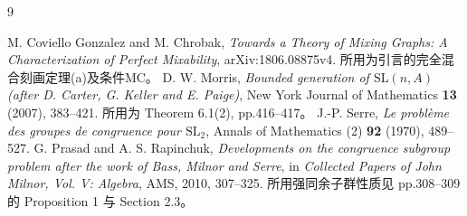 \documentclass[11pt,a4paper,oneside,openany]{book}
\theoremstyle{definition}
\numberwithin{equation}{chapter}
\begin{document}
\backmatter
\begin{thebibliography}{9}
 M. Coviello Gonzalez and M. Chrobak,
\emph{Towards a Theory of Mixing Graphs: A Characterization of Perfect Mixability},
arXiv:1806.08875v4. 所用为引言的完全混合刻画定理(a)及条件MC。
 D. W. Morris,
\emph{Bounded generation of $\mathrm{SL}(n,A)$ (after D. Carter, G. Keller and E. Paige)},
New York Journal of Mathematics \textbf{13} (2007), 383--421.
所用为 Theorem 6.1(2), pp.416--417。
 J.-P. Serre,
\emph{Le probl\`eme des groupes de congruence pour $\mathrm{SL}_2$},
Annals of Mathematics (2) \textbf{92} (1970), 489--527.
 G. Prasad and A. S. Rapinchuk,
\emph{Developments on the congruence subgroup problem after the work of Bass, Milnor and Serre},
in \emph{Collected Papers of John Milnor, Vol. V: Algebra}, AMS, 2010, 307--325.
所用强同余子群性质见 pp.308--309 的 Proposition 1 与 Section 2.3。
\end{thebibliography}
\end{document}
